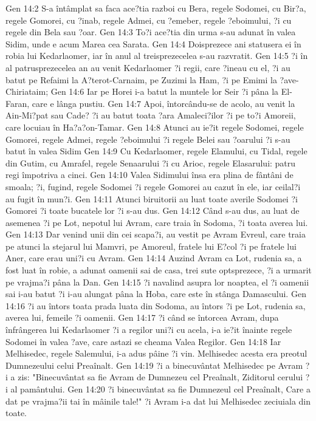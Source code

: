 Gen 14:2  S-a întâmplat sa faca ace?tia razboi cu Bera, regele Sodomei, cu Bir?a, regele Gomorei, cu ?inab, regele Admei, cu ?emeber, regele ?eboimului, ?i cu regele din Bela sau ?oar.
Gen 14:3  To?i ace?tia din urma s-au adunat în valea Sidim, unde e acum Marea cea Sarata.
Gen 14:4  Doisprezece ani statusera ei în robia lui Kedarlaomer, iar în anul al treisprezecelea s-au razvratit.
Gen 14:5  ?i în al patrusprezecelea an au venit Kedarlaomer ?i regii, care ?ineau cu el, ?i au batut pe Refaimi la A?terot-Carnaim, pe Zuzimi la Ham, ?i pe Emimi la ?ave-Chiriataim;
Gen 14:6  Iar pe Horei i-a batut la muntele lor Seir ?i pâna la El-Faran, care e lânga pustiu.
Gen 14:7  Apoi, întorcându-se de acolo, au venit la Ain-Mi?pat sau Cade? ?i au batut toata ?ara Amaleci?ilor ?i pe to?i Amoreii, care locuiau în Ha?a?on-Tamar.
Gen 14:8  Atunci au ie?it regele Sodomei, regele Gomorei, regele Admei, regele ?eboimului ?i regele Belei sau ?oarului ?i s-au batut în valea Sidim
Gen 14:9  Cu Kedarlaomer, regele Elamului, cu Tidal, regele din Gutim, cu Amrafel, regele Senaarului ?i cu Arioc, regele Elasarului: patru regi împotriva a cinci.
Gen 14:10  Valea Sidimului însa era plina de fântâni de smoala; ?i, fugind, regele Sodomei ?i regele Gomorei au cazut în ele, iar ceilal?i au fugit în mun?i.
Gen 14:11  Atunci biruitorii au luat toate averile Sodomei ?i Gomorei ?i toate bucatele lor ?i s-au dus.
Gen 14:12  Când s-au dus, au luat de asemenea ?i pe Lot, nepotul lui Avram, care traia în Sodoma, ?i toata averea lui.
Gen 14:13  Dar venind unii din cei scapa?i, au vestit pe Avram Evreul, care traia pe atunci la stejarul lui Mamvri, pe Amoreul, fratele lui E?col ?i pe fratele lui Aner, care erau uni?i cu Avram.
Gen 14:14  Auzind Avram ca Lot, rudenia sa, a fost luat în robie, a adunat oamenii sai de casa, trei sute optsprezece, ?i a urmarit pe vrajma?i pâna la Dan.
Gen 14:15  ?i navalind asupra lor noaptea, el ?i oamenii sai i-au batut ?i i-au alungat pâna la Hoba, care este în stânga Damascului.
Gen 14:16  ?i au întors toata prada luata din Sodoma, au întors ?i pe Lot, rudenia sa, averea lui, femeile ?i oamenii.
Gen 14:17  ?i când se întorcea Avram, dupa înfrângerea lui Kedarlaomer ?i a regilor uni?i cu acela, i-a ie?it înainte regele Sodomei în valea ?ave, care astazi se cheama Valea Regilor.
Gen 14:18  Iar Melhisedec, regele Salemului, i-a adus pâine ?i vin. Melhisedec acesta era preotul Dumnezeului celui Preaînalt.
Gen 14:19  ?i a binecuvântat Melhisedec pe Avram ?i a zis: "Binecuvântat sa fie Avram de Dumnezeu cel Preaînalt, Ziditorul cerului ?i al pamântului.
Gen 14:20  ?i binecuvântat sa fie Dumnezeul cel Preaînalt, Care a dat pe vrajma?ii tai în mâinile tale!" ?i Avram i-a dat lui Melhisedec zeciuiala din toate.
